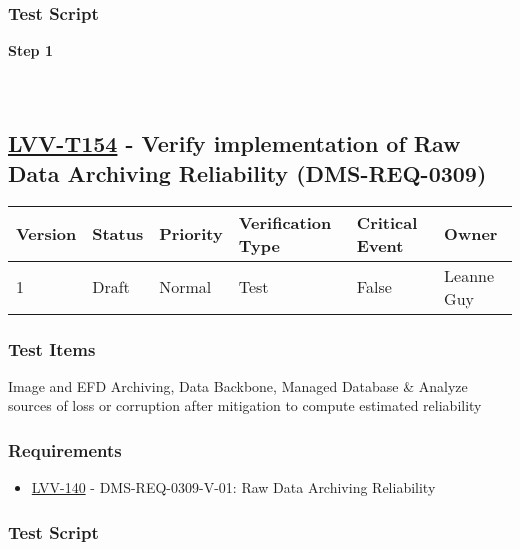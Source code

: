 \hypertarget{test-script-130}{%
\subsubsection{Test Script}\label{test-script-130}}

\textbf{Step 1}\\
~\\
~\\

\hypertarget{lvv-t154---verify-implementation-of-raw-data-archiving-reliability-dms-req-0309}{%
\subsection{\texorpdfstring{\href{https://jira.lsstcorp.org/secure/Tests.jspa\#/testCase/LVV-T154}{LVV-T154}
- Verify implementation of Raw Data Archiving Reliability
(DMS-REQ-0309)}{LVV-T154 - Verify implementation of Raw Data Archiving Reliability (DMS-REQ-0309)}}\label{lvv-t154---verify-implementation-of-raw-data-archiving-reliability-dms-req-0309}}

\begin{longtable}[]{@{}llllll@{}}
\toprule
Version & Status & Priority & Verification Type & Critical Event &
Owner\tabularnewline
\midrule
\endhead
1 & Draft & Normal & Test & False & Leanne Guy\tabularnewline
\bottomrule
\end{longtable}

\hypertarget{test-items-130}{%
\subsubsection{Test Items}\label{test-items-130}}

Image and EFD Archiving, Data Backbone, Managed Database \& Analyze
sources of loss or corruption after mitigation to compute estimated
reliability

\hypertarget{requirements-131}{%
\subsubsection{Requirements}\label{requirements-131}}

\begin{itemize}
\tightlist
\item
  \href{https://jira.lsstcorp.org/browse/LVV-140}{LVV-140} -
  DMS-REQ-0309-V-01: Raw Data Archiving Reliability
\end{itemize}

\hypertarget{test-script-131}{%
\subsubsection{Test Script}\label{test-script-131}}

